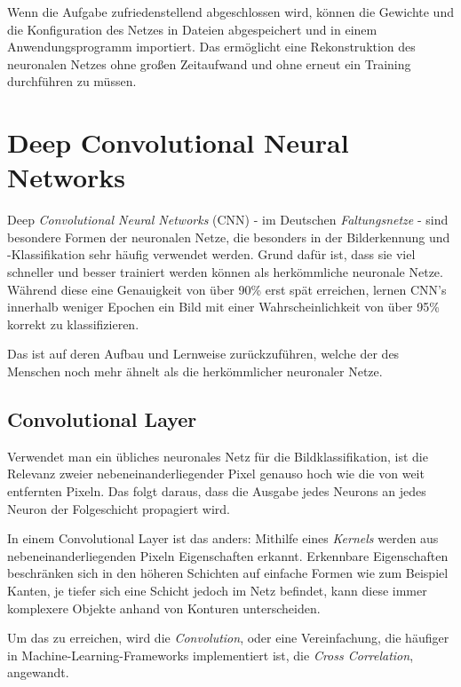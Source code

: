 \documentclass[12pt,a4]{article}
\begin{document}
Wenn die Aufgabe zufriedenstellend abgeschlossen wird, können die Gewichte und die Konfiguration des Netzes in Dateien abgespeichert und in einem Anwendungsprogramm importiert. Das ermöglicht eine Rekonstruktion des neuronalen Netzes ohne großen Zeitaufwand und ohne erneut ein Training durchführen zu müssen.

\section{Deep Convolutional Neural Networks \cite{PythonMachineLearningChapter15}}\label{sec:DCNN}
Deep \textit{Convolutional Neural Networks} (CNN) - im Deutschen \textit{Faltungsnetze} - sind besondere Formen der neuronalen Netze, die besonders in der Bilderkennung und -Klassifikation sehr häufig verwendet werden. Grund dafür ist, dass sie viel schneller und besser trainiert werden können als herkömmliche neuronale Netze. Während diese eine Genauigkeit von über 90\% erst spät erreichen, lernen CNN's innerhalb weniger Epochen ein Bild mit einer Wahrscheinlichkeit von über 95\% korrekt zu klassifizieren.

Das ist auf deren Aufbau und Lernweise zurückzuführen, welche der des Menschen noch mehr ähnelt als die herkömmlicher neuronaler Netze.

\subsection{Convolutional Layer}\label{sec:ConvolutionalLayer}
Verwendet man ein übliches neuronales Netz für die Bildklassifikation, ist die Relevanz zweier nebeneinanderliegender Pixel genauso hoch wie die von weit entfernten Pixeln. Das folgt daraus, dass die Ausgabe jedes Neurons an jedes Neuron der Folgeschicht propagiert wird.

In einem Convolutional Layer ist das anders: Mithilfe eines \textit{Kernels} werden aus nebeneinanderliegenden Pixeln Eigenschaften erkannt. Erkennbare Eigenschaften beschränken sich in den höheren Schichten auf einfache Formen wie zum Beispiel Kanten, je tiefer sich eine Schicht jedoch im Netz befindet, kann diese immer komplexere Objekte anhand von Konturen unterscheiden.

Um das zu erreichen, wird die \textit{Convolution}, oder eine Vereinfachung, die häufiger in Machine-Learning-Frameworks implementiert ist, die\textit{ Cross Correlation}, angewandt.
\end{document}
